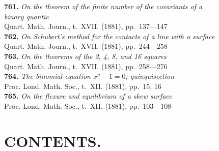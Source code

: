 \documentclass[11pt,a4paper]{book}
\begin{document}
\textbf{761.} \textit{On the theorem of the finite number of the covariants of a}\\
\hspace*{2em}\textit{binary quantic} \\
\hspace*{2em}Quart. Math. Journ., t.~XVII. (1881), pp.~137---147\\[0.3em]
\textbf{762.} \textit{On Schubert's method for the contacts of a line with a surface} \\
\hspace*{2em}Quart. Math. Journ., t.~XVII. (1881), pp.~244---258\\[0.3em]
\textbf{763.} \textit{On the theorems of the 2, 4, 8, and 16 squares} \\
\hspace*{2em}Quart. Math. Journ., t.~XVII. (1881), pp.~258---276\\[0.3em]
\textbf{764.} \textit{The binomial equation $x^p - 1 = 0$; quinquisection} \\
\hspace*{2em}Proc. Lond. Math. Soc., t.~XII. (1881), pp.~15, 16\\[0.3em]
\textbf{765.} \textit{On the flexure and equilibrium of a skew surface} \\
\hspace*{2em}Proc. Lond. Math. Soc., t.~XII. (1881), pp.~103---108

\cleardoublepage

\chapter*{CONTENTS.}
\end{document}
